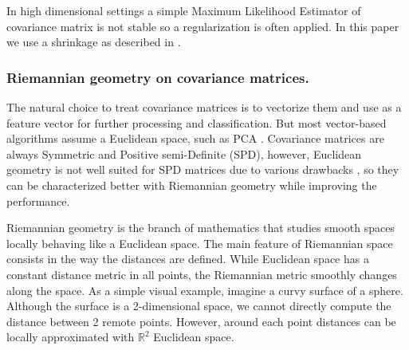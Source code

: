 \documentclass[12pt]{iopart}
\begin{document}
In high dimensional settings a simple Maximum Likelihood Estimator of covariance matrix is not
stable so a regularization is often applied. In this paper we use
a shrinkage as described in \cite{chen_shrinkage_2010}.

\subsubsection{Riemannian geometry on covariance matrices.}
The natural choice to treat covariance matrices is to vectorize them
and use as a feature vector for further processing and classification.
But most vector-based algorithms assume a Euclidean space, such as PCA \cite{hyvarinen_independent_2001}.
Covariance matrices are always
Symmetric and Positive semi-Definite (SPD), however,
Euclidean geometry is not well suited for SPD matrices due to various
drawbacks \cite{arsigny_geometric_2007}, so they can be characterized 
better with Riemannian geometry while improving the performance.

Riemannian geometry is the branch of mathematics that studies
smooth spaces locally behaving like a Euclidean space.
The main feature of Riemannian space consists in the way the distances are defined.
While Euclidean space has a constant distance metric in all points,
the Riemannian metric smoothly changes along the space.
As a simple visual example, imagine a curvy surface of a sphere.
Although the surface is a 2-dimensional space,
we cannot directly compute the distance between 2 remote points.
However, around each point distances can be locally approximated
with $\mathbb{R}^2$ Euclidean space.
\end{document}
